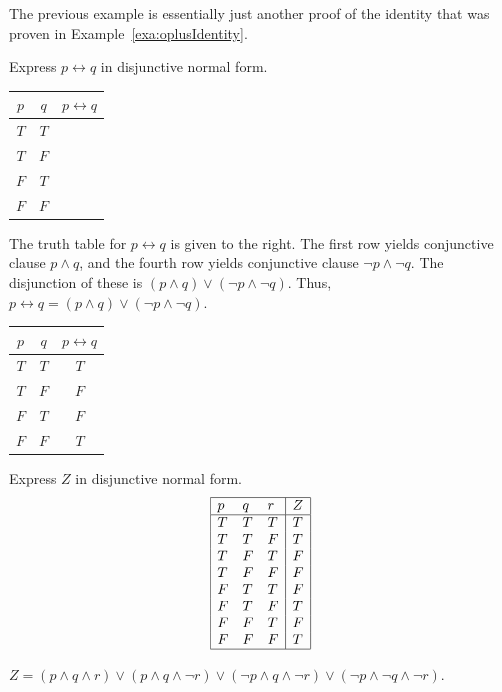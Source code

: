 The previous example is essentially just another proof of the identity that was
proven in Example~\ref{exa:oplusIdentity}.

\begin{exer}
Express $p\leftrightarrow q$ in disjunctive normal form.\\
\begin{minipage}{3in}
\end{minipage}
\hfill
\begin{minipage}{1.5in}
{\Large
\begin{tabular}{|cc||c|}
\hline 
$p$ & $q$ &$p\leftrightarrow q$\\
\hline 
$T$ & $T$& \\
$T$ & $F$& \\
$F$ & $T$& \\
$F$ & $F$& \\
\hline
\end{tabular}
}
\end{minipage}
\vspace*{.5in}

\begin{answer}
\begin{minipage}[t]{4in}
The truth table for $p\leftrightarrow q$ is given to the right.
The first row yields conjunctive clause $p\wedge q$, and the fourth row
yields conjunctive clause $\neg p\wedge \neg q$.  The disjunction of these is
$(p\wedge q)\vee(\neg p\wedge \neg q)$. 
Thus, $p\leftrightarrow q = (p\wedge q)\vee(\neg p\wedge \neg q)$.
\end{minipage}
\hfill
\begin{minipage}[t]{1.5in}
\begin{tabular}[t]{|cc||c|}
\hline 
$p$ & $q$ &$p\leftrightarrow q$\\
\hline 
$T$ & $T$& $T$ \\
$T$ & $F$& $F$ \\
$F$ & $T$& $F$ \\
$F$ & $F$& $T$ \\
\hline
\end{tabular}
\end{minipage}
\end{answer}
\end{exer}


\begin{exa}
Express $Z$ in disjunctive normal form.
$$\begin{array}{|lll|l|}
\hline
p & q & r & Z \\
\hline
T & T & T & T \\
T & T & F & T \\
T & F & T & F \\
T & F & F & F \\
F & T & T & F \\
F & T & F & T \\
F & F & T & F \\
F & F & F & T \\
\hline
\end{array}$$
\begin{sol}
$Z=(p\wedge q \wedge r)\vee
(p\wedge q \wedge \neg r)\vee
(\neg p\wedge q \wedge \neg r)\vee
(\neg p\wedge \neg q \wedge \neg r)$.
\end{sol}
\end{exa}

